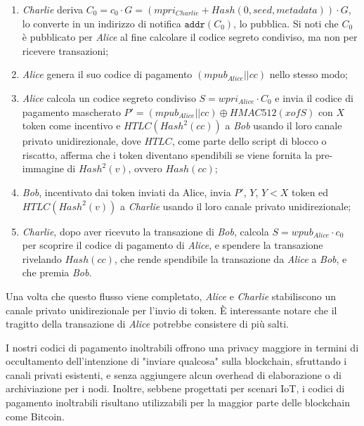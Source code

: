 \begin{enumerate}
	\item \emph{Charlie} deriva $C_0 = c_0\cdot G = (mpri_{Charlie} + Hash(0, seed, metadata))\cdot G$, lo converte in un indirizzo di notifica $\texttt{addr}(C_0)$, lo pubblica. Si noti che $C_0$ è pubblicato per \emph{Alice} al fine calcolare il codice segreto condiviso, ma non per ricevere transazioni;

	\item \emph{Alice} genera il suo codice di pagamento $(mpub_{Alice}||cc)$ nello stesso modo;

	\item \emph{Alice} calcola un codice segreto condiviso $S = wpri_{Alice}\cdot C_0$ e invia il codice di pagamento mascherato $P' = (mpub_{Alice}||cc) \oplus HMAC512(xofS)$ con $X$ token come incentivo e $HTLC(Hash^2(cc))$ a \emph{Bob} usando il loro canale privato unidirezionale, dove $HTLC$, come parte dello script di blocco o riscatto, afferma che i token diventano
	      spendibili se viene fornita la pre-immagine di $Hash^2(v)$, ovvero $Hash (cc)$;

	\item \emph{Bob}, incentivato dai token inviati da Alice, invia $P'$, $Y$, $Y < X$ token ed $HTLC(Hash^2(v))$ a \emph{Charlie} usando il loro canale privato unidirezionale;

	\item \emph{Charlie}, dopo aver ricevuto la transazione di \emph{Bob}, calcola $S = wpub_{Alice}\cdot c_0$ per scoprire il codice di pagamento di \emph{Alice}, e spendere la transazione rivelando $Hash(cc)$, che rende spendibile la transazione da \emph{Alice} a \emph{Bob}, e che premia \emph{Bob}.
\end{enumerate}

Una volta che questo flusso viene completato, \emph{Alice} e \emph{Charlie} stabiliscono un canale privato unidirezionale per l'invio di token. È interessante notare che il tragitto della transazione di \emph{Alice} potrebbe consistere di più salti.

I nostri codici di pagamento inoltrabili offrono una privacy maggiore in termini di occultamento dell'intenzione di "inviare qualcosa" sulla blockchain, sfruttando i canali privati esistenti, e senza aggiungere alcun overhead di elaborazione o di archiviazione per i nodi. Inoltre, sebbene progettati per scenari IoT, i codici di pagamento inoltrabili risultano utilizzabili per la maggior parte delle blockchain come Bitcoin.

